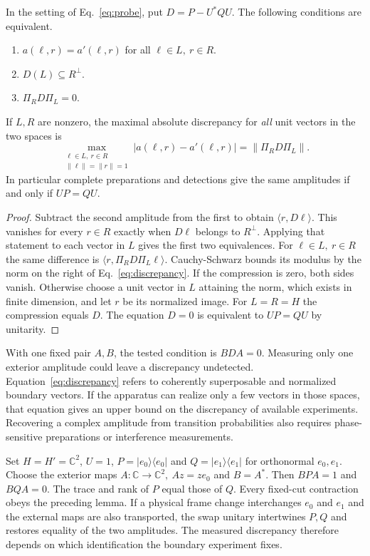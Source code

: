 \documentclass[11pt,letterpaper]{article}
\newcommand{\CC}{\mathbb C}
\begin{document}
\begin{theorem}
\label{thm:criterion}
In the setting of Eq.~\eqref{eq:probe}, put \(D=P-U^*QU\).
The following conditions are equivalent.
\begin{enumerate}
\item \(a(\ell,r)=a'(\ell,r)\) for all \(\ell\in L,\ r\in R\).
\item \(D(L)\subseteq R^\perp\).
\item \(\Pi_R D\Pi_L=0\).
\end{enumerate}
If \(L,R\) are nonzero, the maximal absolute discrepancy for \emph{all}
unit vectors in the two spaces is
\begin{equation}
 \max_{\substack{\ell\in L,\ r\in R\\
                  \|\ell\|=\|r\|=1}}
 |a(\ell,r)-a'(\ell,r)|=\|\Pi_R D\Pi_L\| .
 \label{eq:discrepancy}
\end{equation}
In particular complete preparations and detections give the same amplitudes
if and only if \(UP=QU\).
\end{theorem}
\begin{proof}
Subtract the second amplitude from the first to obtain
\(\langle r,D\ell\rangle\). This vanishes for every \(r\in R\) exactly when
\(D\ell\) belongs to \(R^\perp\). Applying that statement to each vector in
\(L\) gives the first two equivalences. For \(\ell\in L,\ r\in R\) the same
difference is \(\langle r,\Pi_R D\Pi_L\ell\rangle\). Cauchy-Schwarz bounds
its modulus by the norm on the right of Eq.~\eqref{eq:discrepancy}. If
the compression is zero, both sides vanish. Otherwise choose a unit vector
in \(L\) attaining the norm, which exists in finite dimension, and let
\(r\) be its normalized image. For \(L=R=H\) the compression equals
\(D\). The equation \(D=0\) is equivalent to \(UP=QU\) by unitarity.
\end{proof}

With one fixed pair \(A,B\), the tested condition is \(BDA=0\). Measuring
only one exterior amplitude could leave a discrepancy undetected.
Equation~\eqref{eq:discrepancy} refers to coherently superposable and
normalized boundary vectors. If the apparatus can realize only a few
vectors in those spaces, that equation gives an upper bound on the
discrepancy of available experiments. Recovering a complex amplitude from
transition probabilities also requires phase-sensitive preparations or
interference measurements.

\begin{example}
\label{ex:swap}
Set \(H=H'=\CC^2\), \(U=1\),
\(P=|e_0\rangle\langle e_0|\) and \(Q=|e_1\rangle\langle e_1|\) for
orthonormal \(e_0,e_1\). Choose the exterior maps
\(A:\CC\to\CC^2,\ A z=z e_0\) and \(B=A^*\).
Then \(BPA=1\) and \(BQA=0\). The trace and rank of \(P\) equal those
of \(Q\). Every fixed-cut contraction obeys the preceding lemma.
If a physical frame change interchanges \(e_0\) and \(e_1\) and the
external maps are also transported, the swap unitary intertwines \(P,Q\)
and restores equality of the two amplitudes. The measured discrepancy
therefore depends on which identification the boundary experiment fixes.
\end{example}
\end{document}
